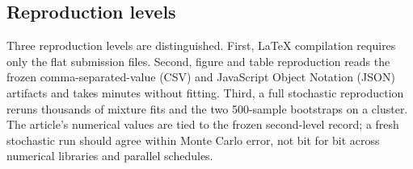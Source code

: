 \documentclass[a4paper,fleqn]{cas-sc}
\numberwithin{equation}{section}
\begin{document}
\subsection{Reproduction levels}

Three reproduction levels are distinguished. First, LaTeX compilation requires only the flat submission files. Second, figure and table reproduction reads the frozen comma-separated-value (CSV) and JavaScript Object Notation (JSON) artifacts and takes minutes without fitting. Third, a full stochastic reproduction reruns thousands of mixture fits and the two 500-sample bootstraps on a cluster. The article's numerical values are tied to the frozen second-level record; a fresh stochastic run should agree within Monte Carlo error, not bit for bit across numerical libraries and parallel schedules.



\end{document}
